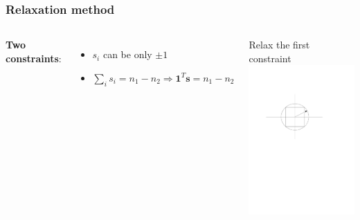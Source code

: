 \documentclass{beamer}
\begin{document}
\begin{frame}
    \frametitle{Relaxation method}
\begin{columns}
    \centering

{\bf Two constraints}:
\vspace{1em}
    \begin{itemize}
    \setlength\itemsep{1em}
        \item{$s_i$ can be only $\pm 1$}
        \item{$\sum\limits_{i}s_i=n_1-n_2 \Rightarrow {\mathbf 1}^T{\mathbf s} = n_1-n_2$}
    \end{itemize}

\centering
\vspace{2em}
Relax the first constraint
\includegraphics[width=\columnwidth,trim=100 400 200 200, clip=true]{hypercube.pdf}
\end{columns}
\end{frame}
\end{document}

